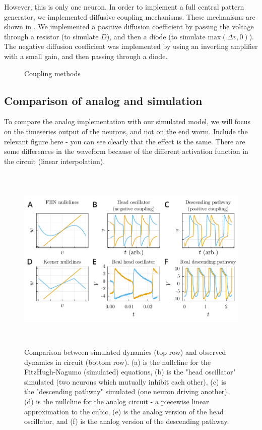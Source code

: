 \documentclass[
    11pt,
]{article}
\begin{document}
However, this is only one neuron.  In order to implement a full central pattern generator, we implemented diffusive coupling mechanisms.  These mechanisms are shown in .  We implemented a positive diffusion coefficient by passing the voltage through a resistor (to simulate $D$), and then a diode (to simulate $\mathrm{max}(\Delta v, 0)$).  The negative diffusion coefficient was implemented by using an inverting amplifier with a small gain, and then passing through a diode.
\newsavebox{\tempbox}
\begin{figure}
    \centering
    \caption{Coupling methods}
    \label{fig: coupling}
\end{figure}

\subsection{Comparison of analog and simulation}

To compare the analog implementation with our simulated model, we will focus on the timeseries output of the neurons, and not on the end worm.  Include the relevant figure here - you can see clearly that the effect is the same.  There are some differences in the waveform because of the different activation function in the circuit (linear interpolation).

\begin{figure}[h!]
    \centering
    \pgfplotsset{}
    \includegraphics[height=9cm]{figures/anal_sim_comp/anal_sim_comp.pdf}
    \caption{Comparison between simulated dynamics (top row) and observed dynamics in circuit (bottom row).  (a) is the nullcline for the FitzHugh-Nagumo (simulated) equations, (b) is the "head oscillator" simulated (two neurons which mutually inhibit each other), (c) is the "descending pathway" simulated (one neuron driving another).  (d) is the nullcline for the analog circuit - a piecewise linear approximation to the cubic, (e) is the analog version of the head oscillator, and (f) is the analog version of the descending pathway.}
    \label{fig: anal_sim_comp}
\end{figure}
\end{document}
